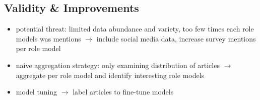     \subsection*{Validity \& Improvements}
    \begin{itemize}
        \item potential threat: limited data abundance and variety, too few times each role models was mentions $\rightarrow$ include social media data, increase survey mentions per role model
        \item naive aggregation strategy: only examining distribution of articles $\rightarrow$ aggregate per role model and identify interesting role models
        \item model tuning $\rightarrow$ label articles to fine-tune models
    \end{itemize}
